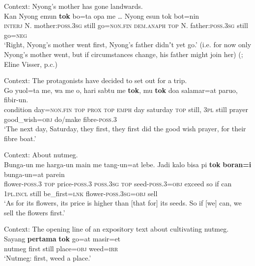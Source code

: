 \begin{exe}
	\ex 
	Context: Nyong’s mother has gone landwards.\\
	\gll Kan Nyong emun	 \textbf{tok} bo=ta opa me … Nyong	esun	tok bot=nin\\
	\textsc{interj} N. mother:\textsc{poss}.3\textsc{sg} still go=\textsc{non}.\textsc{fin} \textsc{dem}.\textsc{anaph} \textsc{top} {} N. father:\textsc{poss}.3\textsc{sg} still go=\textsc{neg}\\
	\glt \lq Right, Nyong's mother went first, Nyong's father didnʼt yet go.' (i.e. for now only Nyong’s mother went, but if circumstances change, his father might join her) (\cite[220]{Visser2022}; Eline Visser, p.c.)


	\ex\label{exappendixKalamangFirst1}
	 Context: The protagonists have decided to set out for a trip.\\
	\gll Go yuol=ta me, wa me o, hari sabtu me \textbf{tok}, mu \textbf{tok} doa salamar=at paruo, fibir-un.\\
	condition day=\textsc{non}.\textsc{fin} \textsc{top}  \textsc{prox} \textsc{top} \textsc{emph} day saturday \textsc{top} still, 3\textsc{pl} still prayer good\_wish=\textsc{obj} do/make fibre-\textsc{poss}.3\\
	\glt \lq The next day, Saturday, they first, they first did the good wish prayer, for their fibre boat.' \parencite{Visser2021b}

	\ex\label{exAppendixKalamangFirstBorani}
	Context: About nutmeg.\\
	\gll Bunga-un me harga-un main me tang-un=at lebe. Jadi kalo bisa pi \textbf{tok} \textbf{boran=i} bunga-un=at parein\\
	flower-\textsc{poss}.3 \textsc{top} price-\textsc{poss}.3 \textsc{poss}.3\textsc{sg} \textsc{top} seed-\textsc{poss}.3=\textsc{obj} exceed so if can 1\textsc{pl}.\textsc{incl} still be\_first=\textsc{lnk} flower-\textsc{poss}.3\textsc{sg}=\textsc{obj} sell\\
	\glt \lq As for its flowers, its price is higher than [that for] its seeds. So if [we] can, we sell the flowers first.' \parencite[34–35]{Visser2021a}
	
	\ex\label{exAppendixKalamangFirstPertama}
	Context: The opening line of an expository text about cultivating nutmeg.\\
	\gll Sayang \textbf{pertama} \textbf{tok} go=at masir=et\\
	nutmeg first still place=\textsc{obj} weed=\textsc{irr}\\
	\glt \lq Nutmeg: first, weed a place.' \parencite[31]{Visser2021a}
\end{exe}


